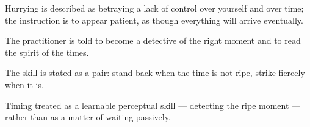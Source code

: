 

\begin{distilled}
  \item Hurrying is described as betraying a lack of control over yourself and over time; the instruction is to appear patient, as though everything will arrive eventually.
  \item The practitioner is told to become a detective of the right moment and to read the spirit of the times.
  \item The skill is stated as a pair: stand back when the time is not ripe, strike fiercely when it is.
\end{distilled}

\begin{unique}
  \item Timing treated as a learnable perceptual skill --- detecting the ripe moment --- rather than as a matter of waiting passively.
\end{unique}
